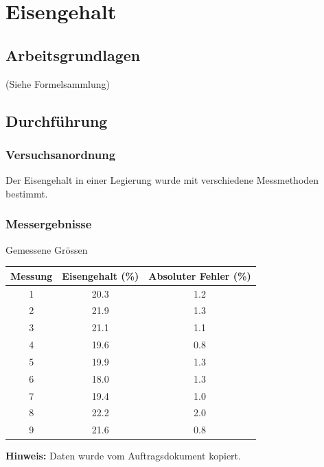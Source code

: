 \section{Eisengehalt}

\subsection{Arbeitsgrundlagen}

(Siehe Formelsammlung)


\subsection{Durchf\"uhrung}

\subsubsection*{Versuchsanordnung}

Der Eisengehalt in einer Legierung wurde mit verschiedene Messmethoden bestimmt.


\subsubsection*{Messergebnisse}

\begin{center}
    \begin{threeparttable}
        \caption{Gemessene Gr\"ossen}
        \begin{tabular}{ccc}
            \toprule
            Messung & Eisengehalt (\%) & Absoluter Fehler (\%) \\
            \midrule
            1   & 20.3  & 1.2 \\
            2   & 21.9  & 1.3 \\
            3   & 21.1  & 1.1 \\
            4   & 19.6  & 0.8 \\
            5   & 19.9  & 1.3 \\
            6   & 18.0  & 1.3 \\
            7   & 19.4  & 1.0 \\
            8   & 22.2  & 2.0 \\
            9   & 21.6  & 0.8 \\
            \bottomrule
        \end{tabular}
        \begin{tablenotes}
            \small
            \item \textbf{Hinweis:} Daten wurde vom Auftragsdokument kopiert.
        \end{tablenotes}
    \end{threeparttable}
\end{center}

